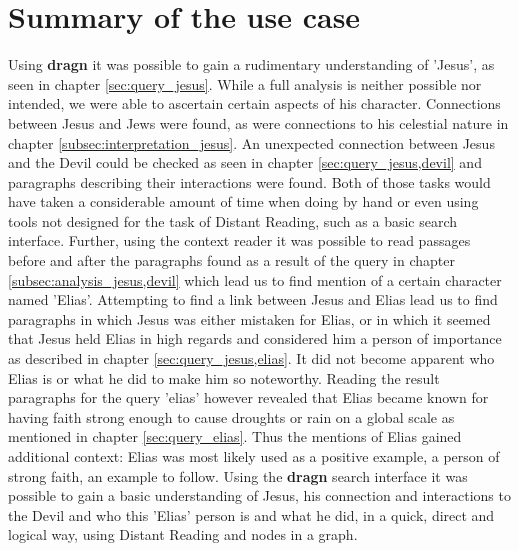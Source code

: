 \section{Summary of the use case}
Using \textbf{dragn} it was possible to gain a rudimentary understanding of 'Jesus', as seen in chapter \ref{sec:query_jesus}. While a full analysis is neither possible nor intended, we were able to ascertain certain aspects of his character. Connections between Jesus and Jews were found, as were connections to his celestial nature in chapter \ref{subsec:interpretation_jesus}. An unexpected connection between Jesus and the Devil could be checked as seen in chapter \ref{sec:query_jesus,devil} and paragraphs describing their interactions were found. Both of those tasks would have taken a considerable amount of time when doing by hand or even using tools not designed for the task of Distant Reading, such as a basic search interface. Further, using the context reader it was possible to read passages before and after the paragraphs found as a result of the query in chapter \ref{subsec:analysis_jesus,devil} which lead us to find mention of a certain character named 'Elias'. Attempting to find a link between Jesus and Elias lead us to find paragraphs in which Jesus was either mistaken for Elias, or in which it seemed that Jesus held Elias in high regards and considered him a person of importance as described in chapter \ref{sec:query_jesus,elias}. It did not become apparent who Elias is or what he did to make him so noteworthy. Reading the result paragraphs for the query 'elias' however revealed that Elias became known for having faith strong enough to cause droughts or rain on a global scale as mentioned in chapter \ref{sec:query_elias}. Thus the mentions of Elias gained additional context: Elias was most likely used as a positive example, a person of strong faith, an example to follow. Using the \textbf{dragn} search interface it was possible to gain a basic understanding of Jesus, his connection and interactions to the Devil and who this 'Elias' person is and what he did, in a quick, direct and logical way, using Distant Reading and nodes in a graph.